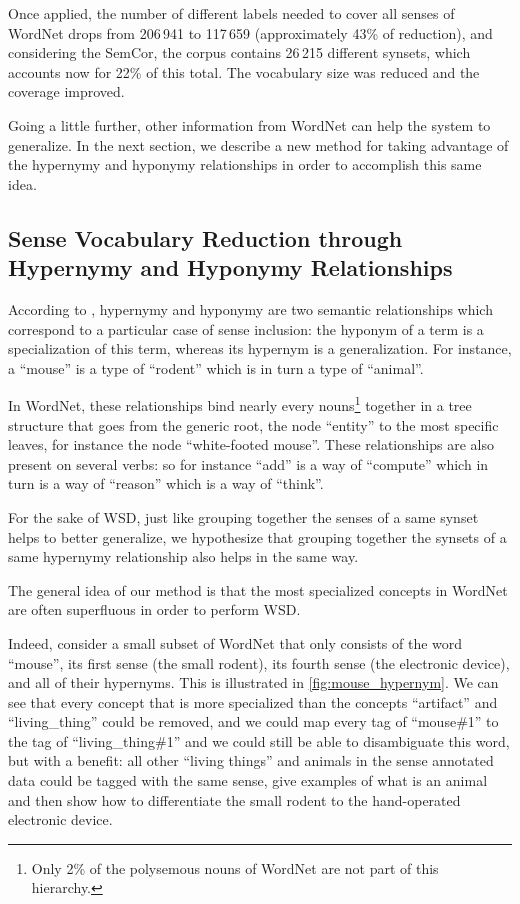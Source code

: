 \documentclass[11pt,a4paper]{article}
\begin{document}
Once applied, the number of different labels needed to cover all senses of WordNet drops from 206\,941 to 117\,659 (approximately 43\% of reduction), and considering the SemCor, the corpus contains 26\,215 different synsets, which accounts now for 22\% of this total. The vocabulary size was reduced and the coverage improved.



Going a little further, other information from WordNet can help the system to generalize. In the next section, we describe a new method for taking advantage of the hypernymy and hyponymy relationships in order to accomplish this same idea.


\subsection{Sense Vocabulary Reduction through Hypernymy and Hyponymy Relationships}\label{sec:method}

According to \citet{polguere2003}, hypernymy and hyponymy are two semantic relationships which correspond to a particular case of sense inclusion:
the hyponym of a term is a specialization of this term, whereas its hypernym is a generalization. For instance, a ``mouse'' is a type of ``rodent'' which is in turn a type of ``animal''.

In WordNet, these relationships bind nearly every nouns\footnote{Only 2\% of the polysemous nouns of WordNet are not part of this hierarchy.} together in a tree structure that goes from the generic root, the node ``entity'' to the most specific leaves, for instance the node ``white-footed mouse''. These relationships are also present on several verbs: so for instance ``add'' is a way of ``compute'' which in turn is a way of ``reason'' which is a way of ``think''. 

For the sake of WSD, just like grouping together the senses of a same synset helps to better generalize, we hypothesize that grouping together the synsets of a same hypernymy relationship also helps in the same way. 

The general idea of our method is that the most specialized concepts in WordNet are often superfluous in order to perform WSD. 

Indeed, consider a small subset of WordNet that only consists of the word ``mouse'', its first sense (the small rodent), its fourth sense (the electronic device), and all of their hypernyms. This is illustrated in \autoref{fig:mouse_hypernym}. We can see that every concept that is more specialized than the concepts ``artifact'' and ``living\_thing'' could be removed, and we could map every tag of ``mouse\#1'' to the tag of ``living\_thing\#1'' and we could still be able to disambiguate this word, but with a benefit: all other ``living things'' and animals in the sense annotated data could be tagged with the same sense, give examples of what is an animal and then show how to differentiate the small rodent to the hand-operated electronic device. 
\end{document}
